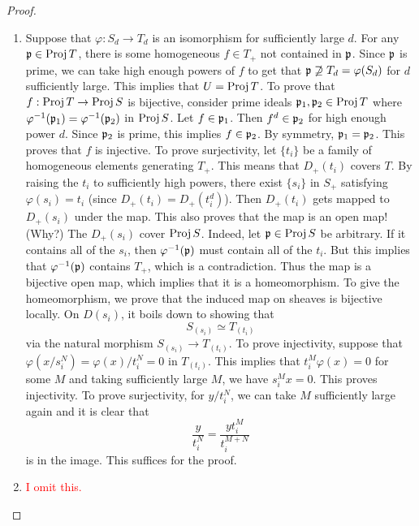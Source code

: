 \documentclass[]{pcmi}
\theoremstyle{plain}
\theoremstyle{definition}
\theoremstyle{remark}
\begin{document}
\begin{proof}
\begin{enumerate}[label = (\alph*)]
        \item Suppose that $\varphi : S_d \to T_d$ is an isomorphism for sufficiently large $d$. For any $\mathfrak{p} \in \operatorname{Proj} T$, there is some homogeneous $f \in T_+$ not contained in $\mathfrak{p}$. Since $\mathfrak{p}$ is prime, we can take high enough powers of $f$ to get that $\mathfrak{p} \not\supseteq T_d = \varphi(S_d)$ for $d$ sufficiently large. This implies that $U = \operatorname{Proj} T$. To prove that $f : \operatorname{Proj} T \to \operatorname{Proj} S$ is bijective, consider prime ideals $\mathfrak{p}_1, \mathfrak{p}_2 \in \operatorname{Proj} T$ where $\varphi^{-1}(\mathfrak{p}_1) = \varphi^{-1}(\mathfrak{p}_2)$ in $\operatorname{Proj} S$. Let $f \in \mathfrak{p}_1$. Then $f^d \in \mathfrak{p}_2$ for high enough power $d$. Since $\mathfrak{p}_2$ is prime, this implies $f \in \mathfrak{p}_2$. By symmetry, $\mathfrak{p}_1 = \mathfrak{p}_2$. This proves that $f$ is injective. To prove surjectivity, let $\{t_i\}$ be a family of homogeneous elements generating $T_+$. This means that $D_+(t_i)$ covers $T$. By raising the $t_i$ to sufficiently high powers, there exist $\{s_i\}$ in $S_+$ satisfying $\varphi(s_i) = t_i$ (since $D_+(t_i) = D_+(t_i^d)$). Then $D_+(t_i)$ gets mapped to $D_+(s_i)$ under the map. This also proves that the map is an open map! (Why?) The $D_+(s_i)$ cover $\operatorname{Proj} S$. Indeed, let $\mathfrak{p} \in \operatorname{Proj} S$ be arbitrary. If it contains all of the $s_i$, then $\varphi^{-1}(\mathfrak{p})$ must contain all of the $t_i$. But this implies that $\varphi^{-1}(\mathfrak{p})$ contains $T_+$, which is a contradiction. Thus the map is a bijective open map, which implies that it is a homeomorphism. To give the homeomorphism, we prove that the induced map on sheaves is bijective locally. On $D(s_i)$, it boils down to showing that 
        \[
            S_{(s_i)} \simeq T_{(t_i)}
        \]
        via the natural morphism $S_{(s_i)} \to T_{(t_i)}$. To prove injectivity, suppose that $\varphi(x/s_i^N) = \varphi(x)/t_i^N = 0$ in $T_{(t_i)}$. This implies that $t_i^M \varphi(x) = 0$ for some $M$ and taking sufficiently large $M$, we have $s_i^M x = 0$. This proves injectivity. To prove surjectivity, for $y/t_i^N$, we can take $M$ sufficiently large again and it is clear that 
        \[
            \frac{y}{t_i^N} = \frac{y t_i^M}{t_i^{M+N}} 
        \]
        is in the image. This suffices for the proof. 

        \item \textcolor{red}{I omit this.}
    \end{enumerate}
\end{proof}
\end{document}
